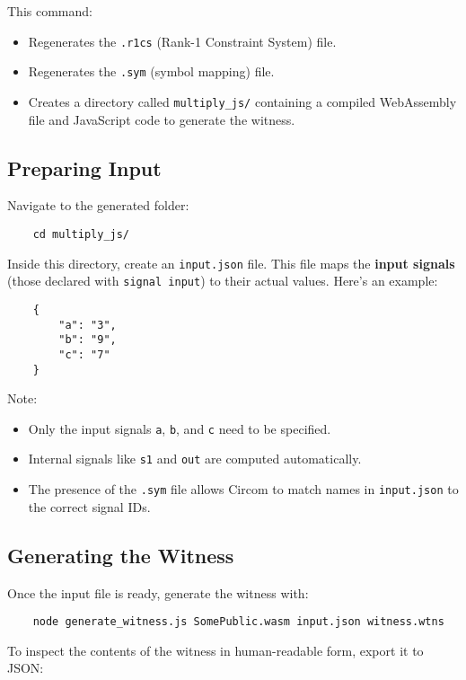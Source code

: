 \documentclass{article}
\begin{document}
This command:
\begin{itemize}
	\item Regenerates the \texttt{.r1cs} (Rank-1 Constraint System) file.
	\item Regenerates the \texttt{.sym} (symbol mapping) file.
	\item Creates a directory called \texttt{multiply\_js/} containing a compiled WebAssembly file and JavaScript code to generate the witness.
\end{itemize}

\subsection*{Preparing Input}

Navigate to the generated folder:

\begin{verbatim}
	cd multiply_js/
\end{verbatim}
Inside this directory, create an \texttt{input.json} file. This file maps the \textbf{input signals} (those declared with \texttt{signal input}) to their actual values. Here's an example:


\begin{verbatim}
	{
		"a": "3",
		"b": "9",
		"c": "7"
	}
\end{verbatim}

Note:
\begin{itemize}
	\item Only the input signals \texttt{a}, \texttt{b}, and \texttt{c} need to be specified.
	\item Internal signals like \texttt{s1} and \texttt{out} are computed automatically.
	\item The presence of the \texttt{.sym} file allows Circom to match names in \texttt{input.json} to the correct signal IDs.
\end{itemize}

\subsection*{Generating the Witness}

Once the input file is ready, generate the witness with:

\begin{verbatim}
	node generate_witness.js SomePublic.wasm input.json witness.wtns
\end{verbatim}

To inspect the contents of the witness in human-readable form, export it to JSON:
\end{document}
